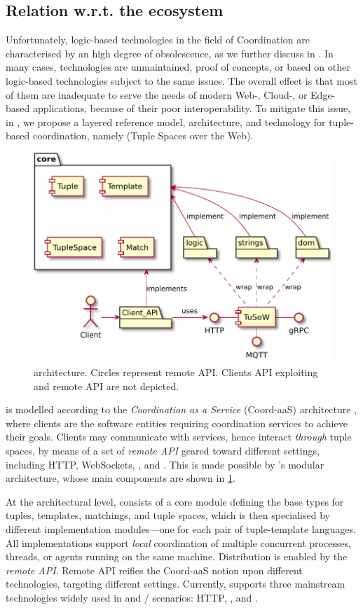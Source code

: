 \documentclass[12pt,a4paper,openright,twoside]{book}
\begin{document}
\subsection{Relation w.r.t. the ecosystem}

Unfortunately, logic-based technologies in the field of Coordination are characterised by an high degree of obsolescence, as we further discuss in \cite{coordination-jlamp2020}.
%
In many cases, technologies are unmaintained, proof of concepts, or based on other logic-based technologies subject to the same issues.
%
The overall effect is that most of them are inadequate to serve the needs of modern Web-, Cloud-, or Edge-based applications, because of their poor interoperability.
%
To mitigate this issue, in \cite{tusow-icccn2019}, we propose a layered reference model, architecture, and technology for tuple-based coordination, namely \tusow{} (Tuple Spaces over the Web).

\begin{figure}
    \centering
    \includegraphics[width=.5\linewidth]{figures/tusow-architecture.pdf}
    \caption{\tusow{} architecture. Circles represent \tusow{} remote API. Clients API exploiting \mqtt{} and \grpc{} remote API are not depicted.}
    \label{tusow-components}
\end{figure}

\tusow{} is modelled according to the \emph{Coordination as a Service} (Coord-aaS) architecture \cite{coord-fundinfo73}, where clients are the software entities requiring coordination services to achieve their goals.
%
Clients may communicate with services, hence interact \emph{through} tuple spaces, by means of a set of \emph{remote API} geared toward different settings, including HTTP, WebSockets, \grpc{}, and \mqtt{}.
%
This is made possible by \tusow{}'s modular architecture, whose main components are shown in \cref{tusow-components}.

At the architectural level, \tusow{} consists of a core module defining the base types for tuples, templates, matchings, and tuple spaces, which is then specialised by different implementation modules---one for each pair of tuple-template languages.
%
All implementations support \emph{local} coordination of multiple concurrent processes, threads, or agents running on the same machine.
%
Distribution is enabled by the \emph{remote API}.
%
Remote API reifies the Coord-aaS notion upon different technologies, targeting different settings.
%
Currently, \tusow{} supports three mainstream technologies widely used in \cps{} and \wot{}/\iot{} scenarios: HTTP, \grpc{}, and \mqtt{}.
\end{document}
